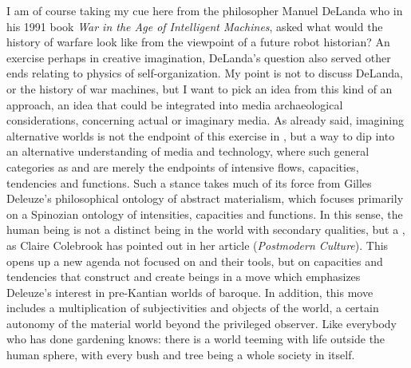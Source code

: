 {I am of course taking my cue here from the philosopher Manuel DeLanda
who in his 1991 book {\em War in the Age of Intelligent Machines},
asked what would the history of warfare look like from the viewpoint of
a future robot historian? An exercise perhaps in creative imagination,
DeLanda's question also served other ends relating to physics of
self{}-organization. My point is not to discuss DeLanda, or the history
of war machines, but I want to pick an idea from this kind of an
approach, an idea that could be integrated into media archaeological
considerations, concerning actual or imaginary media. As already said,
imagining alternative worlds is not the endpoint of this exercise in
, but a way to dip into an alternative understanding of
media and technology, where such general categories as  and
 are merely the endpoints of intensive flows, capacities,
tendencies and functions. Such a stance takes much of its force from
Gilles Deleuze's philosophical ontology of abstract
materialism, which focuses primarily on a Spinozian ontology of
intensities, capacities and functions. In this sense, the human being
is not a distinct being in the world with secondary qualities, but a
, as Claire Colebrook
has pointed out in her article  ({\em Postmodern
Culture}). This opens up a new agenda not focused on  and their
tools, but on capacities and tendencies that construct and create
beings in a move which emphasizes Deleuze's interest in pre{}-Kantian
worlds of baroque. In addition, this move includes a multiplication of
subjectivities and objects of the world, a certain autonomy of the
material world beyond the privileged observer. Like everybody who has
done gardening knows: there is a world teeming with life outside the
human sphere, with every bush and tree being a whole society in itself.

}

